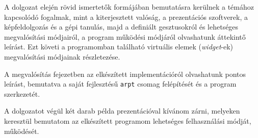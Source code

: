 A dolgozat elején rövid ismertetők formájában bemutatásra kerülnek a témához kapcsolódó fogalmak, mint a kiterjesztett valóság, a prezentációs szoftverek, a képfeldolgozás és a gépi tanulás, majd a definiált gesztusokról és lehetséges megvalósítási módjairól, a program működési módjáról olvashatunk áttekintő leírást. Ezt követi a programomban található virtuális elemek (\textit{widget}-ek) megvalósítási módjainak részletezése.

A megvalósítás fejezetben az elkészített implementációról olvashatunk pontos leírást, bemutatva a saját fejlesztésű \texttt{arpt} csomag felépítését és a program szerkezetét.

A dolgozatot végül két darab példa prezentációval kívánom zárni, melyeken keresztül bemutatom az elkészített programom lehetséges felhasználási módját, működését.
